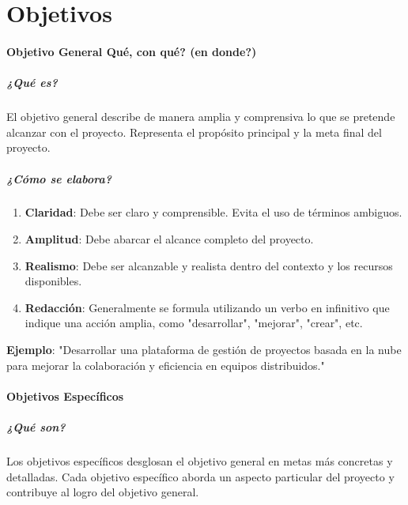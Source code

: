 \chapter{Objetivos}
\label{Objetivos}

\subsubsection{Objetivo General {Qué, con qué? (en donde?)}}

\paragraph{¿Qué es?}

El objetivo general describe de manera amplia y comprensiva lo que se pretende alcanzar con el proyecto. Representa el propósito principal y la meta final del proyecto.

\paragraph{¿Cómo se elabora?}

\begin{enumerate}
    \item \textbf{Claridad}: Debe ser claro y comprensible. Evita el uso de términos ambiguos.
    \item \textbf{Amplitud}: Debe abarcar el alcance completo del proyecto.
    \item \textbf{Realismo}: Debe ser alcanzable y realista dentro del contexto y los recursos disponibles.
    \item \textbf{Redacción}: Generalmente se formula utilizando un verbo en infinitivo que indique una acción amplia, como "desarrollar", "mejorar", "crear", etc.
\end{enumerate}
\textbf{Ejemplo}: "Desarrollar una plataforma de gestión de proyectos basada en la nube para mejorar la colaboración y eficiencia en equipos distribuidos."

\subsubsection{Objetivos Específicos}

\paragraph{¿Qué son?}

Los objetivos específicos desglosan el objetivo general en metas más concretas y detalladas. Cada objetivo específico aborda un aspecto particular del proyecto y contribuye al logro del objetivo general.


